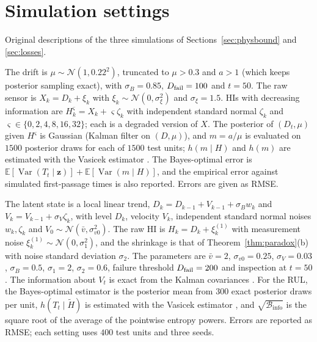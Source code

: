 \documentclass[preprint,12pt]{elsarticle}
\theoremstyle{definition}
\newcommand{\E}{\mathbb{E}}
\newcommand{\Binfo}{\mathcal{B}_{\mathrm{info}}}
\DeclareMathOperator{\Var}{Var}
\begin{document}
\section{Simulation settings}
\label{app:sim}
Original descriptions of the three simulations of Sections~\ref{sec:physbound} and \ref{sec:losses}.

The drift is $\mu\sim\mathcal N(1,0.22^2)$, truncated to $\mu>0.3$ and $a>1$ (which keeps posterior sampling exact), with $\sigma_B=0.85$, $D_{\rm fail}=100$ and $t=50$. The raw sensor is $X_k=D_k+\xi_k$ with $\xi_k\sim\mathcal N(0,\sigma_\xi^2)$ and $\sigma_\xi=1.5$. HIs with decreasing information are $H^{\varsigma}_k=X_k+\varsigma\zeta_k$ with independent standard normal $\zeta_k$ and $\varsigma\in\{0,2,4,8,16,32\}$; each is a degraded version of $X$. The posterior of $(D_t,\mu)$ given $H^\varsigma$ is Gaussian (Kalman filter on $(D,\mu)$), and $m=a/\mu$ is evaluated on $1500$ posterior draws for each of $1500$ test units; $h(m\mid H)$ and $h(m)$ are estimated with the Vasicek estimator \cite{vasicek1976}. The Bayes-optimal error is $\E[\Var(T_t\mid\mathbf z)]+\E[\Var(m\mid H)]$, and the empirical error against simulated first-passage times is also reported. Errors are given as RMSE.

The latent state is a local linear trend, $D_k=D_{k-1}+V_{k-1}+\sigma_Bw_k$ and $V_k=V_{k-1}+\sigma_V\zeta_k$, with level $D_k$, velocity $V_k$, independent standard normal noises $w_k,\zeta_k$ and $V_0\sim\mathcal N(\bar v,\sigma_{v0}^2)$. The raw HI is $H_k=D_k+\xi^{(1)}_k$ with measurement noise $\xi^{(1)}_k\sim\mathcal N(0,\sigma_1^2)$, and the shrinkage is that of Theorem~\ref{thm:paradox}(b) with noise standard deviation $\sigma_2$. The parameters are $\bar v=2$, $\sigma_{v0}=0.25$, $\sigma_V=0.03$, $\sigma_B=0.5$, $\sigma_1=2$, $\sigma_2=0.6$, failure threshold $D_{\rm fail}=200$ and inspection at $t=50$. The information about $V_t$ is exact from the Kalman covariances \cite{kalman1960,durbin2012}. For the RUL, the Bayes-optimal estimator is the posterior mean from $300$ exact posterior draws per unit, $h(T_t\mid\tilde H)$ is estimated with the Vasicek estimator \cite{vasicek1976}, and $\sqrt{\Binfo}$ is the square root of the average of the pointwise entropy powers. Errors are reported as RMSE; each setting uses $400$ test units and three seeds.
\end{document}
